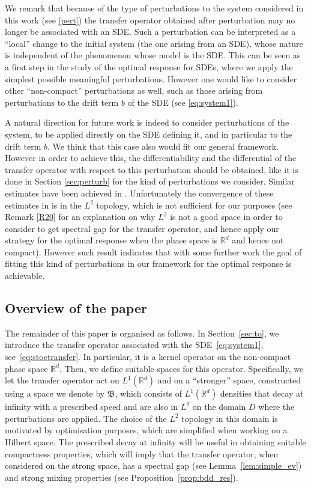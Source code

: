\documentclass{amsart}
\newcommand\fB{{\mathfrak B}}
\begin{document}
 We remark that because of the type of perturbations to the system considered in this work (see \eqref{pert}) the transfer operator obtained after perturbation may no longer be associated with an SDE. Such a perturbation can be interpreted as a ``local'' change to the initial system (the one arising from an SDE), whose nature is independent of the phenomenon whose model is the SDE. This can  be seen as a first step in the study of the optimal response for SDEs, where we apply the simplest possible meaningful perturbations. However one would like to consider other ``non-compact'' perturbations as well, such as those arising from perturbations to the drift term $b$ of the SDE (see \eqref{eq:system1}). 


A natural direction for future work is indeed to consider perturbations of the system, to be applied directly on the SDE defining it, and in particular to the drift term $b$.
We think that this case also would fit our general framework. 
However in order to achieve this,
the differentiability and the differential of the transfer operator with respect to this perturbation should be obtained, like it is done
in Section \ref{sec:perturb} for the kind of perturbations we consider. Similar estimates have been achieved in \cite{KLP}. Unfortunately the convergence of these estimates in \cite{KLP} is in the $L^2$ topology, which is not sufficient for our purposes
(see Remark \ref{R20} for an explanation on why $L^2$ is not a good space in order to consider to get spectral gap for the transfer operator, and hence apply our strategy for the optimal response when the phase space is  $\mathbb{R}^d$ and hence not compact).
However such result indicates that with some further work the goal of fitting this kind of perturbations in our framework for the optimal response is achievable. 



\subsection*{Overview of the paper}

The remainder of this paper is organised as follows. In Section~\ref{sec:to}, we introduce the transfer operator associated with the SDE~\eqref{eq:system1}, see~\eqref{eq:stoctransfer}. In particular, it is a kernel operator on the non-compact phase space $\mathbb{R}^d$. Then, we define suitable spaces for this operator. Specifically, we let the transfer operator act on $L^1(\mathbb{R}^d)$ and on a ``stronger'' space, constructed using a space we denote by 
$\fB$, which consists of $L^1(\mathbb{R}^d)$ densities that decay at infinity with a prescribed speed and are also in $L^2 $ on the domain $D$ where the perturbations are applied. The choice of the $L^2$ topology in this domain is motivated by optimisation purposes, which are simplified when working on a Hilbert space. The prescribed decay at infinity will be useful in obtaining suitable compactness properties, which will imply that the transfer operator, when considered on the strong space, has a spectral gap (see Lemma~\ref{lem:simple_ev}) and strong mixing properties (see Proposition~\ref{prop:bdd_res}).
\end{document}
